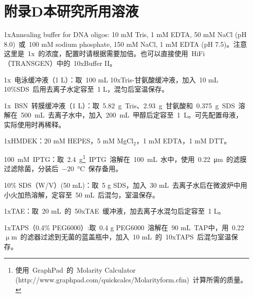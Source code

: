 \chapter{附录D\quad 本研究所用溶液}\label{appen:D}
\renewcommand{\leftmark}{附录D\quad 本研究所用溶液}
\begin{compactitem}[\FourClowerSolid]
\item 1xAnnealing buffer for DNA oligos: 10 mM Tris, 1 mM EDTA, 50 mM NaCl (pH 8.0)\ 或\ 100 mM sodium phosphate, 150 mM NaCl, 1 mM EDTA (pH 7.5)。注意这里是\ 1x\ 的浓度，配置时请根据需要加倍。也可以直接使用\ HiFi（TRANSGEN）中的\ 10xBuffer II。
\vspace{2ex}
\item 1x\ 电泳缓冲液（1 L）：取\ 100 mL 10xTris-甘氨酸缓冲液，加入\ 10 mL 10\%SDS\ 后用去离子水定容至\ 1 L，混匀后室温保存。
\vspace{2ex}
\item 1x\ BSN\ 转膜缓冲液（1 L）：取\ \SI{5.82}{\g}\ Tris、\SI{2.93}{\g}\ 甘氨酸和\ \SI{0.375}{\g}\ SDS\ 溶解在\ \SI{500}{\mL}\ 去离子水中，加入\ \SI{200}{\mL}\ 甲醇后定容至\ \SI{1}{\L}。可先配置母液，实际使用时再稀释。
\vspace{2ex}
\item 1xHMDEK：20 mM HEPES，5 mM MgCl$_2$，1 mM EDTA，1 mM DTT。
\vspace{2ex}
\item \SI{100}{\milli\nauticalmile}\ IPTG：取\ \SI{2.4}{\g}\footnote{使用\ GraphPad\ 的\ Molarity Calculator (http://www.graphpad.com/quickcalcs/Molarityform.cfm)\ 计算所需的质量。}\ IPTG\ 溶解在\ \SI{100}{\mL}\ 水中，使用\ \SI{0.22}{\um}\ 的滤膜过滤除菌，分装后\ \SI{-20}{\degreeCelsius}\ 保存备用。
\vspace{2ex}
\item 10\% SDS（W/V）(50 mL)：取\ 5 g SDS，加入\ 30 mL\ 去离子水后在微波炉中用小火加热溶解，定容至\ 50 mL\ 后混匀，室温保存。
\vspace{2ex}
\item 1xTAE：取\ 20 mL\ 的\ 50xTAE\ 缓冲液，加去离子水混匀后定容至\ 1 L。
\vspace{2ex}
\item 1xTAPS（0.4\% PEG6000）:取\ 0.4 g PEG6000\ 溶解在\ 90 mL\ TAP中，用\ 0.22 $\upmu$m\ 的滤器过滤到无菌的蓝盖瓶中，加入\ 10 mL\ 的\ 10xTAPS\ 后混匀室温保存。
\vspace{2ex}

\end{compactitem}
